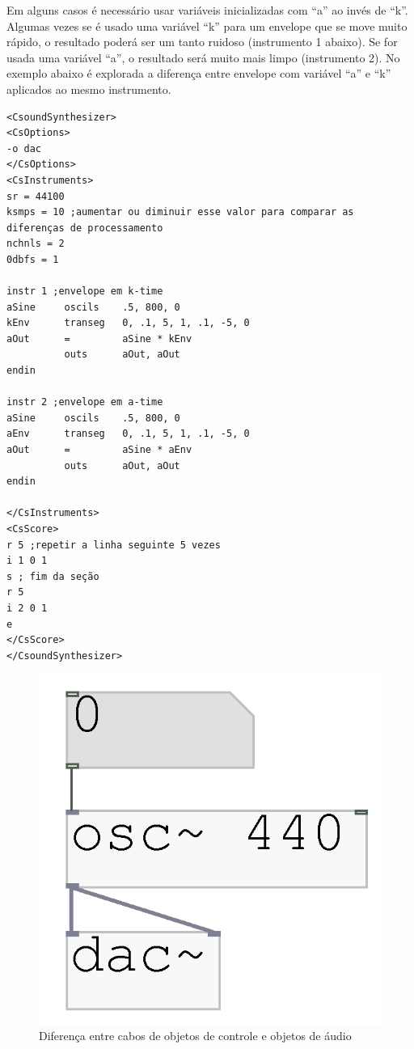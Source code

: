 \documentclass[draft]{ppgmus}
\begin{document}
Em alguns casos é necessário usar variáveis inicializadas com ``a'' ao invés de ``k''. Algumas vezes 
se é usado uma variável ``k'' para um envelope que se move muito rápido, o resultado poderá ser
um tanto ruidoso (instrumento 1 abaixo). Se for usada uma variável ``a'', o resultado será 
muito mais limpo (instrumento 2). No exemplo abaixo é explorada a diferença
entre envelope com variável ``a'' e ``k'' aplicados ao mesmo instrumento.

\begin{verbatim}
<CsoundSynthesizer>
<CsOptions>
-o dac
</CsOptions>
<CsInstruments>
sr = 44100
ksmps = 10 ;aumentar ou diminuir esse valor para comparar as diferenças de processamento
nchnls = 2
0dbfs = 1

instr 1 ;envelope em k-time
aSine     oscils    .5, 800, 0
kEnv      transeg   0, .1, 5, 1, .1, -5, 0
aOut      =         aSine * kEnv
          outs      aOut, aOut
endin

instr 2 ;envelope em a-time
aSine     oscils    .5, 800, 0
aEnv      transeg   0, .1, 5, 1, .1, -5, 0
aOut      =         aSine * aEnv
          outs      aOut, aOut
endin

</CsInstruments>
<CsScore>
r 5 ;repetir a linha seguinte 5 vezes
i 1 0 1
s ; fim da seção
r 5 
i 2 0 1
e
</CsScore>
</CsoundSynthesizer>
\end{verbatim} 

\begin{figure}
\includegraphics[scale=.6]{cabos}
\caption{Diferença entre cabos de objetos de controle e objetos de áudio}
\label{cabos}
\end{figure}
\end{document}
